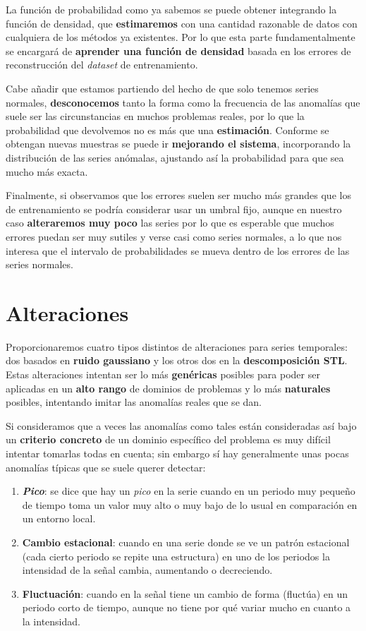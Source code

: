 La función de probabilidad como ya sabemos se puede obtener integrando la función de densidad, que \textbf{estimaremos} con una cantidad razonable de datos con cualquiera de los métodos ya existentes. Por lo que esta parte fundamentalmente se encargará de \textbf{aprender una función de densidad} basada en los errores de reconstrucción del \emph{dataset} de entrenamiento.

Cabe añadir que estamos partiendo del hecho de que solo tenemos series normales, \textbf{desconocemos} tanto la forma como la frecuencia de las anomalías que suele ser las circunstancias en muchos problemas reales, por lo que la probabilidad que devolvemos no es más que una \textbf{estimación}. Conforme se obtengan nuevas muestras se puede ir \textbf{mejorando el sistema}, incorporando la distribución de las series anómalas, ajustando así la probabilidad para que sea mucho más exacta.

Finalmente, si observamos que los errores suelen ser mucho más grandes que los de entrenamiento se podría considerar usar un umbral fijo, aunque en nuestro caso \textbf{alteraremos muy poco} las series por lo que es esperable que muchos errores puedan ser muy sutiles y verse casi como series normales, a lo que nos interesa que el intervalo de probabilidades se mueva dentro de los errores de las series normales.

\chapter{Alteraciones}\label{ch:ad-alteraciones}

Proporcionaremos cuatro tipos distintos de alteraciones para series temporales: dos basados en \textbf{ruido gaussiano} y los otros dos en la \textbf{descomposición STL}. Estas alteraciones intentan ser lo más \textbf{genéricas} posibles para poder ser aplicadas en un \textbf{alto rango} de dominios de problemas y lo más \textbf{naturales} posibles, intentando imitar las anomalías reales que se dan.

Si consideramos que a veces las anomalías como tales están consideradas así bajo un \textbf{criterio concreto} de un dominio específico del problema es muy difícil intentar tomarlas todas en cuenta; sin embargo sí hay generalmente unas pocas anomalías típicas que se suele querer detectar:

\begin{enumerate}
  \item \textbf{\emph{Pico}}: se dice que hay un \emph{pico} en la serie cuando en un periodo muy pequeño de tiempo toma un valor muy alto o muy bajo de lo usual en comparación en un entorno local.
  \item \textbf{Cambio estacional}: cuando en una serie donde se ve un patrón estacional (cada cierto periodo se repite una estructura) en uno de los periodos la intensidad de la señal cambia, aumentando o decreciendo.
  \item \textbf{Fluctuación}: cuando en la señal tiene un cambio de forma (fluctúa) en un periodo corto de tiempo, aunque no tiene por qué variar mucho en cuanto a la intensidad.
\end{enumerate}

